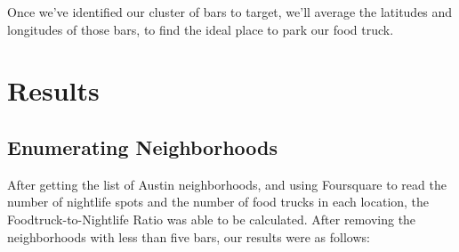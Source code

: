 \documentclass{deagle}
\begin{document}
Once we've identified our cluster of bars to target, we'll average the latitudes and longitudes of those bars, to find the ideal place to park our food truck.

\section*{Results}

\subsection*{Enumerating Neighborhoods}

After getting the list of Austin neighborhoods, and using Foursquare to read the number of nightlife spots and the number of food trucks in each location, the Foodtruck-to-Nightlife Ratio was able to be calculated. After removing the neighborhoods with less than five bars, our results were as follows:
\end{document}

